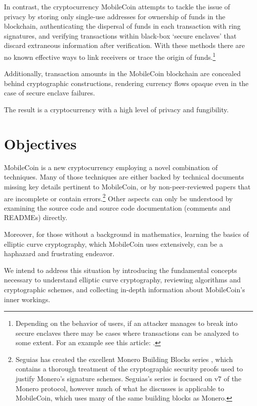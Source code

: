 In contrast, the cryptocurrency MobileCoin attempts to tackle the issue of privacy by storing only single-use addresses for ownership of funds in the blockchain, authenticating the dispersal of funds in each transaction with ring signatures, and verifying transactions within black-box `secure enclaves' that discard extraneous information after verification. With these methods there are no known effective ways to link receivers or trace the origin of funds.\footnote{Depending on the behavior of users, if an attacker manages to break into secure enclaves there may be cases where transactions can be analyzed to some extent. For an example see this article: \cite{monero-ring-heuristics-ryo}.}

Additionally, transaction amounts in the MobileCoin blockchain are concealed behind cryptographic constructions, rendering currency flows opaque even in the case of secure enclave failures.

The result is a cryptocurrency with a high level of privacy and fungibility.



\section{Objectives}
\label{sec:goals}

MobileCoin is a new cryptocurrency employing a novel combination of techniques. Many of those techniques are either backed by technical documents missing key details pertinent to MobileCoin, or by non-peer-reviewed papers that are incomplete or contain errors.\footnote{Seguias has created the excellent Monero Building Blocks series \cite{monero-building-blocks}, which contains a thorough treatment of the cryptographic security proofs used to justify Monero's signature schemes. Seguias's series is focused on v7 of the Monero protocol, however much of what he discusses is applicable to MobileCoin, which uses many of the same building blocks as Monero.} Other aspects can only be understood by examining the source code and source code documentation (comments and READMEs) directly.

Moreover, for those without a background in mathematics, learning the basics of elliptic curve cryptography, which MobileCoin uses extensively, can be a haphazard and frustrating endeavor.

We intend to address this situation by introducing the fundamental concepts necessary to understand elliptic curve cryptography, reviewing algorithms and cryptographic schemes, and collecting in-depth information about MobileCoin’s inner workings.

